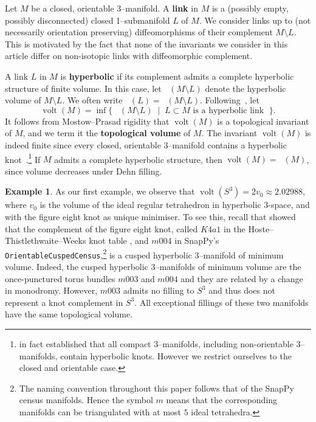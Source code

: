 \documentclass[a4paper]{gtart}
\theoremstyle{definition}
\newtheorem{example}[proposition]{Example}
\theoremstyle{remark}
\numberwithin{equation}{section}
\DeclareMathOperator{\volt}{volt}
\DeclareMathOperator{\volh}{vol_{\mathbb{H}}}
\begin{document}
Let $M$ be a closed, orientable 3--manifold.
A \textbf{link} in $M$ is a (possibly empty, possibly disconnected) closed 1--submanifold $L$ of $M.$ 
We consider links up to (not necessarily orientation preserving) diffeomorphisms of their complement $M\setminus L$. This is motivated by the fact that none of the invariants we consider in this article differ on non-isotopic links with diffeomorphic complement.

A link $L$ in $M$ is \textbf{hyperbolic} if its complement admits a complete hyperbolic structure of finite volume. In this case, let $\volh(M\setminus L)$ denote the hyperbolic volume of $M\setminus L.$ We often write $\volh(L) = \volh(M\setminus L).$
Following~\cite[\S 1.3.2]{BBBMP}, let
\begin{equation}
\volt(M) = \inf \big\{ \; \volh(M\setminus L) \;\mid \; L \subset M \text{ is a hyperbolic link } \; \big\}.
\end{equation}
It follows from Mostow--Prasad rigidity that $\volt(M)$ is a topological invariant of $M$, and we term it the \textbf{topological volume} of $M.$ 
The invariant $\volt(M)$ is indeed finite since every closed, orientable 3--manifold contains a hyperbolic knot~\cite{My82,My93}.\footnote{\cite{My93} in fact established that all compact $3$--manifolds, including non-orientable $3$--manifolds, contain hyperbolic knots. However we restrict ourselves to the closed and orientable case.} If $M$ admits a complete hyperbolic structure, then $\volt(M)=\volh(M)$, since volume decreases under Dehn filling.

\begin{example}\label{ex:volume-S3}
As our first example, we observe that $\volt(S^3)=2{v}_0 \approx 2.02988$, where ${v}_0$ is the volume of the ideal regular tetrahedron in hyperbolic $3$-space, and with the figure eight knot as unique minimiser. To see this, recall that \cite{cao-meyerhoff} showed that the complement of the figure eight knot, called $K4a1$ in the Hoste--Thistlethwaite--Weeks knot table \cite{HTWKnots}, and $m004$ in SnapPy's \cite{snappy} \texttt{OrientableCuspedCensus},\footnote{The naming convention throughout this paper follows that of the SnapPy census manifolds. Hence the symbol $m$ means that the corresponding manifolds can be triangulated with at most $5$ ideal tetrahedra.} is a cusped hyperbolic 3--manifold of minimum volume. Indeed, the cusped hyperbolic 3--manifolds of minimum volume are the once-punctured torus bundles $m003$ and $m004$ and they are related by a change in monodromy. However, $m003$ admits no filling to $S^3$ and thus does not represent a knot complement in $S^3$. All exceptional fillings of these two manifolds have the same topological volume.
\end{example}
\end{document}
